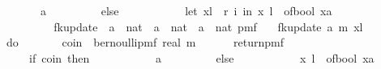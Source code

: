 \begin{isabellebody}
\ \ \ \ \ \ \ \ \ \ {\isacharparenleft}{\kern0pt}a{\isacharcomma}{\kern0pt}{}{\isacharparenright}{\kern0pt}\ \isanewline
\ \ \ \ \ \ \ \ else\ {\isacharparenleft}{\kern0pt}\isanewline
\ \ \ \ \ \ \ \ \ \ let\ {\isacharparenleft}{\kern0pt}x{\isacharcomma}{\kern0pt}l{\isacharparenright}{\kern0pt}\ {\isacharequal}{\kern0pt}\ r\ i\ in\ {\isacharparenleft}{\kern0pt}x{\isacharcomma}{\kern0pt}\ l\ {\isacharplus}{\kern0pt}\ of{\isacharunderscore}{\kern0pt}bool\ {\isacharparenleft}{\kern0pt}x{\isacharequal}{\kern0pt}a{\isacharparenright}{\kern0pt}{\isacharparenright}{\kern0pt}\isanewline
\ \ \ \ \ \ \ \ {\isacharparenright}{\kern0pt}\isanewline
\ \ \ \ \ \ {\isacharparenright}{\kern0pt}\isanewline
\ \ \ \ {\isacharbraceright}{\kern0pt}{\isachardoublequoteclose}\isanewline
\isanewline
{}\isamarkupfalse%
\ fk{\isacharunderscore}{\kern0pt}update{\isacharprime}{\kern0pt}{\isacharprime}{\kern0pt}\ {\isacharcolon}{\kern0pt}{\isacharcolon}{\kern0pt}\ {\isachardoublequoteopen}{\isacharprime}{\kern0pt}a\ {\isasymRightarrow}\ nat\ {\isasymRightarrow}\ {\isacharparenleft}{\kern0pt}{\isacharprime}{\kern0pt}a\ {\isasymtimes}\ nat{\isacharparenright}{\kern0pt}\ {\isasymRightarrow}\ {\isacharparenleft}{\kern0pt}{\isacharparenleft}{\kern0pt}{\isacharprime}{\kern0pt}a\ {\isasymtimes}\ nat{\isacharparenright}{\kern0pt}{\isacharparenright}{\kern0pt}\ pmf{\isachardoublequoteclose}\ \isanewline
\ \ {\isachardoublequoteopen}fk{\isacharunderscore}{\kern0pt}update{\isacharprime}{\kern0pt}{\isacharprime}{\kern0pt}\ a\ m\ {\isacharparenleft}{\kern0pt}x{\isacharcomma}{\kern0pt}l{\isacharparenright}{\kern0pt}\ {\isacharequal}{\kern0pt}\ \isanewline
\ \ \ \ do\ {\isacharbraceleft}{\kern0pt}\isanewline
\ \ \ \ \ \ coin\ {\isasymleftarrow}\ bernoulli{\isacharunderscore}{\kern0pt}pmf\ {\isacharparenleft}{\kern0pt}{}{\isacharslash}{\kern0pt}{\isacharparenleft}{\kern0pt}real\ m{\isacharplus}{\kern0pt}{}{\isacharparenright}{\kern0pt}{\isacharparenright}{\kern0pt}{\isacharsemicolon}{\kern0pt}\isanewline
\ \ \ \ \ \ return{\isacharunderscore}{\kern0pt}pmf\ {\isacharparenleft}{\kern0pt}\ \isanewline
\ \ \ \ \ \ \ \ if\ coin\ then\ \isanewline
\ \ \ \ \ \ \ \ \ \ {\isacharparenleft}{\kern0pt}a{\isacharcomma}{\kern0pt}{}{\isacharparenright}{\kern0pt}\ \isanewline
\ \ \ \ \ \ \ \ else\ {\isacharparenleft}{\kern0pt}\isanewline
\ \ \ \ \ \ \ \ \ \ {\isacharparenleft}{\kern0pt}x{\isacharcomma}{\kern0pt}\ l\ {\isacharplus}{\kern0pt}\ of{\isacharunderscore}{\kern0pt}bool\ {\isacharparenleft}{\kern0pt}x{\isacharequal}{\kern0pt}a{\isacharparenright}{\kern0pt}{\isacharparenright}{\kern0pt}\isanewline

\end{isabellebody}
